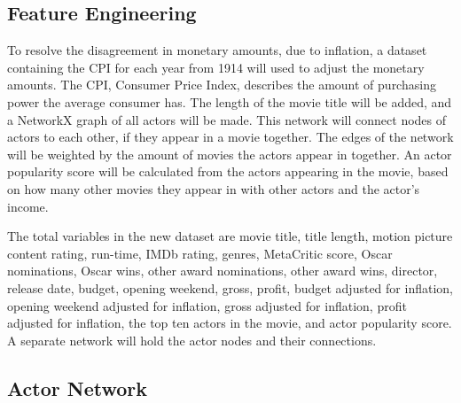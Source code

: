 \documentclass{article}
\begin{document}
\hypertarget{feature-engineering}{%
	\subsection{Feature Engineering}\label{feature-engineering}}

To resolve the disagreement in monetary amounts, due to
inflation, a dataset containing the CPI for each year from 1914 will
used to adjust the monetary amounts. The CPI, Consumer Price Index,
describes the amount of purchasing power the average consumer has. The
length of the movie title will be added, and a NetworkX graph of all
actors will be made. This network will connect nodes of actors to each
other, if they appear in a movie together. The edges of the network will
be weighted by the amount of movies the actors appear in together. An
actor popularity score will be calculated from the actors appearing in
the movie, based on how many other movies they appear in with other
actors and the actor's income.

The total variables in the new dataset are movie title, title length,
motion picture content rating, run-time, IMDb rating, genres, MetaCritic
score, Oscar nominations, Oscar wins, other award nominations, other
award wins, director, release date, budget, opening weekend, gross,
profit, budget adjusted for inflation, opening weekend adjusted for
inflation, gross adjusted for inflation, profit adjusted for inflation,
the top ten actors in the movie, and actor popularity score. A separate
network will hold the actor nodes and their connections. 


\hypertarget{actor-network}{%
	\subsection{Actor Network}\label{actor-network}}
\end{document}
